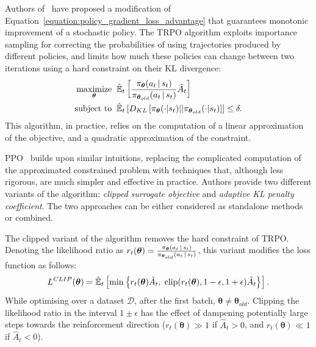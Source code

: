 Authors of~\parencite{schulman_trust_2017} have proposed 
a modification of Equation~\eqref{equation:policy_gradient_loss_advantage} that guarantees monotonic improvement of a stochastic policy.
The \ac{TRPO} algorithm exploits importance sampling for correcting the probabilities of using trajectories produced by different policies, and limits how much these policies can change between two iterations using a hard constraint on their \ac{KL} divergence:
%
\begin{align*}
    \mathop{\text{maximize}}_{\boldsymbol{\theta}} \;\; & \hat{\operatorname*{\mathbb{E}}}_t \left[ \frac{\pi_{\boldsymbol{\theta}}(a_t \operatorname{\mid} s_t)}{\pi_{\boldsymbol{\theta}_{old}}(a_t \operatorname{\mid} s_t)} \hat{A}_t \right] \\
    \text{subject to} \;\; & \hat{\operatorname*{\mathbb{E}}}_t \left[ D_{KL}\left[\pi_{\boldsymbol{\theta}}(\cdot|s_t) || \pi_{\boldsymbol{\theta}_{old}}(\cdot|s_t)\right] \right] \leq \delta.
\end{align*}
%
This algorithm, in practice, relies on the computation of a linear approximation of the objective, and a quadratic approximation of the constraint.

\ac{PPO}~\parencite{schulman_proximal_2017} builds upon similar intuitions,
replacing the complicated computation of the approximated constrained problem with techniques that, although less rigorous, are much simpler and effective in practice.
Authors provide two different variants of the algorithm: \emph{clipped surrogate objective} and \emph{adaptive KL penalty coefficient}.
The two approaches can be either considered as standalone methods or combined.

The clipped variant of the algorithm removes the hard constraint of \acs{TRPO}.
Denoting the likelihood ratio as $r_t(\boldsymbol{\theta}) = \frac{\pi_{\boldsymbol{\theta}}(a_t \operatorname{\mid} s_t)}{\pi_{\boldsymbol{\theta}_{old}}(a_t \operatorname{\mid} s_t)}$, this variant modifies the loss function as follows:
%
\begin{equation*}
    L^{CLIP}(\boldsymbol{\theta}) = \hat{\operatorname*{\mathbb{E}}}_t \left[ \min \left\{ r_t(\boldsymbol{\theta}) \hat{A}_t, \; \operatorname{clip} (r_t(\boldsymbol{\theta}), 1 - \epsilon, 1+\epsilon) \hat{A}_t \right\} \right] .
\end{equation*}
%
While optimising over a dataset $\mathcal{D}$, after the first batch, $\boldsymbol{\theta} \neq \boldsymbol{\theta}_{old}$.
Clipping the likelihood ratio in the interval $1 \pm \epsilon$ has the effect of dampening potentially large steps towards the reinforcement direction ($r_t(\boldsymbol{\theta}) \gg 1$ if $\hat{A}_t>0$, and $r_t(\boldsymbol{\theta}) \ll 1$ if $\hat{A}_t < 0$).

